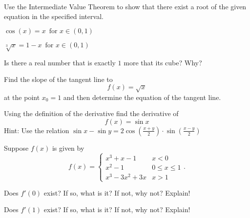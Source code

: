 \documentclass[unboxed]{hwset}
\begin{document}
\begin{problem}[1.]
	Use the Intermediate Value Theorem to show that there exist a root of the
	given equation in the specified interval.
	\be
		\item $\cos(x)=x\, \text{ for } x\in (0,1)$
		\item $\sqrt[3]{x}=1-x\, \text{ for } x\in(0,1)$
	\ee
\end{problem}

\begin{problem}[2.]
	Is there a real number that is exactly $1$ more that its cube? Why?
\end{problem}

\begin{problem}[3.] 
	Find the slope of the tangent line to 
	\begin{equation*}
		f(x) = \sqrt{x}
	\end{equation*}
	at the point $x_0 = 1$ and then determine the equation of the tangent line.
\end{problem}

\begin{problem}[4.] 
	Using the definition of the derivative find the derivative of 
	\begin{equation*}
		f(x) = \sin x
	\end{equation*}
	Hint: Use the relation $\sin x - \sin y =	2 \cos\left(\frac{x +
			y}{2}\right)\cdot \sin\left( \frac{x - y}{2}\right)$  
\end{problem}

\begin{problem}[5.] 
	Suppose $f(x)$ is given by
	\begin{equation*}
		f(x)=\begin{cases}
			x^{3}+x-1 & x< 0 \\
			x^{2}-1 &		0\leq x\leq 1 \\
			x^{3}-3x^{2}+3x & x > 1
		\end{cases}.
	\end{equation*}
	\be
		\item Does $f'(0)$ exist? If so, what is it? If not, why not? Explain!\\
		\item Does $f'(1)$ exist? If so, what is it? If not, why not? Explain!\\
	\ee
\end{problem}
\end{document}
